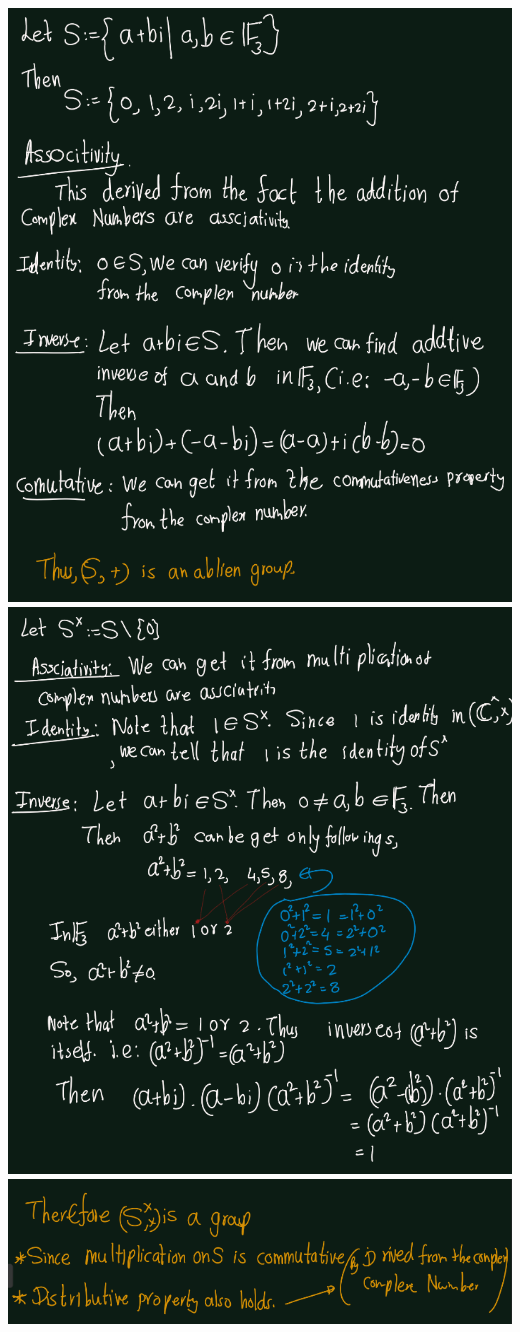 \documentclass[
]{book}
\theoremstyle{definition}
\theoremstyle{definition}
\theoremstyle{definition}
\theoremstyle{definition}
\theoremstyle{remark}
\begin{document}
\includegraphics{figures/ch_3/ex-1.11-1.png}
\includegraphics{figures/ch_3/ex-1.11-2.png}
\includegraphics{figures/ch_3/ex-1.11-3.png}
\end{document}
